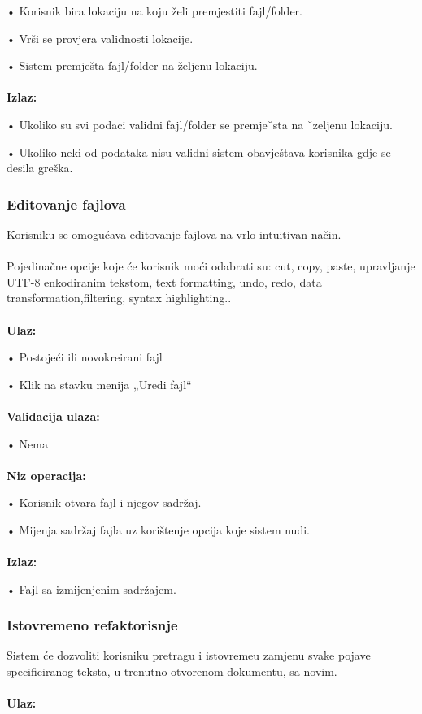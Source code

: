 \documentclass[12pt]{article}
\begin{document}
•	Korisnik bira lokaciju na koju želi premjestiti fajl/folder. 

•	Vrši se provjera validnosti lokacije.

•	Sistem premješta fajl/folder na željenu lokaciju.\\ \\
\textbf{Izlaz:}

•	Ukoliko su svi podaci validni fajl/folder se premjeˇsta na ˇzeljenu lokaciju. 

•	Ukoliko neki od podataka nisu validni sistem obavještava korisnika gdje se desila greška.

\subsubsection{Editovanje fajlova}

Korisniku se omogućava editovanje fajlova na vrlo intuitivan način.\\ \\
Pojedinačne opcije koje će korisnik moći odabrati su: cut, copy, paste, upravljanje UTF-8 enkodiranim tekstom, text formatting, undo, redo, data transformation,filtering, syntax highlighting..\\ \\
\textbf{Ulaz:}

•	Postojeći ili novokreirani fajl  

•	Klik na stavku menija „Uredi fajl“\\ \\
\textbf{Validacija ulaza:}

•	Nema\\ \\
\textbf{Niz operacija:}

•	Korisnik otvara fajl i njegov sadržaj. 

•	Mijenja sadržaj fajla uz korištenje opcija koje sistem nudi.\\ \\
\textbf{Izlaz:}

•	Fajl sa izmijenjenim sadržajem.

\subsubsection{Istovremeno refaktorisnje}
Sistem će dozvoliti korisniku pretragu i istovremeu zamjenu svake pojave specificiranog teksta, u trenutno otvorenom dokumentu, sa novim. \\ \\
\textbf{Ulaz:}
\end{document}
